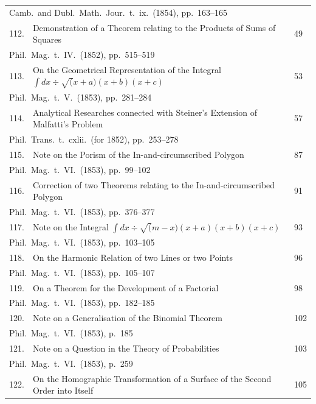 \documentclass[11pt,a4paper]{book}
\begin{document}
\begin{longtable}{rp{8cm}l}
\multicolumn{3}{l}{\small Camb.\ and Dubl.\ Math.\ Jour.\ t.\ ix.\ (1854), pp.\ 163--165}\\[0.5em]
112. & Demonstration of a Theorem relating to the Products of Sums of Squares & 49\\
\multicolumn{3}{l}{\small Phil.\ Mag.\ t.\ IV.\ (1852), pp.\ 515--519}\\[0.5em]
113. & On the Geometrical Representation of the Integral $\int dx \div \surd(x+a)(x+b)(x+c)$ & 53\\
\multicolumn{3}{l}{\small Phil.\ Mag.\ t.\ V.\ (1853), pp.\ 281--284}\\[0.5em]
114. & Analytical Researches connected with Steiner's Extension of Malfatti's Problem & 57\\
\multicolumn{3}{l}{\small Phil.\ Trans.\ t.\ cxlii.\ (for 1852), pp.\ 253--278}\\[0.5em]
115. & Note on the Porism of the In-and-circumscribed Polygon & 87\\
\multicolumn{3}{l}{\small Phil.\ Mag.\ t.\ VI.\ (1853), pp.\ 99--102}\\[0.5em]
116. & Correction of two Theorems relating to the In-and-circumscribed Polygon & 91\\
\multicolumn{3}{l}{\small Phil.\ Mag.\ t.\ VI.\ (1853), pp.\ 376--377}\\[0.5em]
117. & Note on the Integral $\int dx \div \surd(m-x)(x+a)(x+b)(x+c)$ & 93\\
\multicolumn{3}{l}{\small Phil.\ Mag.\ t.\ VI.\ (1853), pp.\ 103--105}\\[0.5em]
118. & On the Harmonic Relation of two Lines or two Points & 96\\
\multicolumn{3}{l}{\small Phil.\ Mag.\ t.\ VI.\ (1853), pp.\ 105--107}\\[0.5em]
119. & On a Theorem for the Development of a Factorial & 98\\
\multicolumn{3}{l}{\small Phil.\ Mag.\ t.\ VI.\ (1853), pp.\ 182--185}\\[0.5em]
120. & Note on a Generalisation of the Binomial Theorem & 102\\
\multicolumn{3}{l}{\small Phil.\ Mag.\ t.\ VI.\ (1853), p.\ 185}\\[0.5em]
121. & Note on a Question in the Theory of Probabilities & 103\\
\multicolumn{3}{l}{\small Phil.\ Mag.\ t.\ VI.\ (1853), p.\ 259}\\[0.5em]
122. & On the Homographic Transformation of a Surface of the Second Order into Itself & 105\\

\end{longtable}
\end{document}
